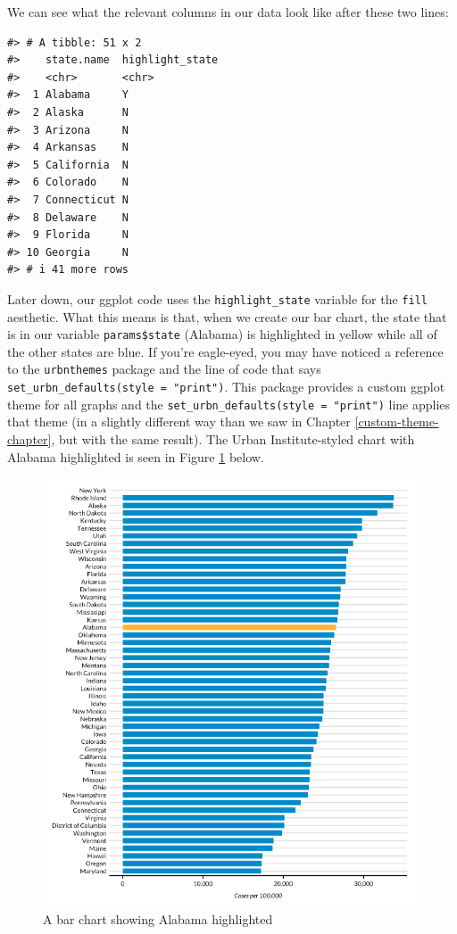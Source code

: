 \documentclass[
]{book}
\begin{document}
We can see what the relevant columns in our data look like after these two lines:

\begin{verbatim}
#> # A tibble: 51 x 2
#>    state.name  highlight_state
#>    <chr>       <chr>          
#>  1 Alabama     Y              
#>  2 Alaska      N              
#>  3 Arizona     N              
#>  4 Arkansas    N              
#>  5 California  N              
#>  6 Colorado    N              
#>  7 Connecticut N              
#>  8 Delaware    N              
#>  9 Florida     N              
#> 10 Georgia     N              
#> # i 41 more rows
\end{verbatim}

Later down, our ggplot code uses the \texttt{highlight\_state} variable for the \texttt{fill} aesthetic. What this means is that, when we create our bar chart, the state that is in our variable \texttt{params\$state} (Alabama) is highlighted in yellow while all of the other states are blue. If you're eagle-eyed, you may have noticed a reference to the \texttt{urbnthemes} package and the line of code that says \texttt{set\_urbn\_defaults(style\ =\ "print")}. This package provides a custom ggplot theme for all graphs and the \texttt{set\_urbn\_defaults(style\ =\ "print")} line applies that theme (in a slightly different way than we saw in Chapter \ref{custom-theme-chapter}, but with the same result). The Urban Institute-styled chart with Alabama highlighted is seen in Figure \ref{fig:alabama-covid-chart} below.

\begin{figure}
\includegraphics[width=1\linewidth]{assets/alabama-covid-chart} \caption{A bar chart showing Alabama highlighted}\label{fig:alabama-covid-chart}
\end{figure}
\end{document}
